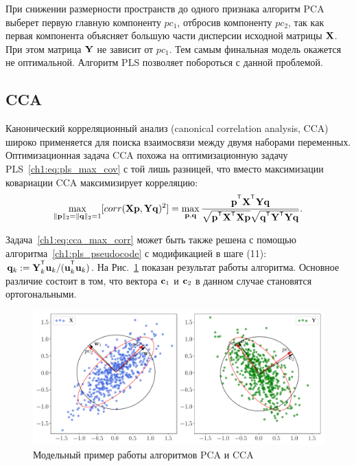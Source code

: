 При снижении размерности пространств до одного признака алгоритм PCA выберет первую главную компоненту $pc_1$, отбросив компоненту $pc_2$, так как первая компонента объясняет большую части дисперсии исходной матрицы $\mathbf{X}$. 
При этом матрица $\mathbf{Y}$ не зависит от $pc_1$. 
Тем самым финальная модель окажется не оптимальной.
Алгоритм PLS позволяет побороться с данной проблемой.

\subsection{CCA}

Канонический корреляционный анализ (canonical correlation analysis, CCA) широко применяется для поиска взаимосвязи между двумя наборами переменных. 
Оптимизационная задача CCA похожа на оптимизационную задачу PLS~\eqref{ch1:eq:pls_max_cov} с той лишь разницей, что вместо максимизации ковариации CCA максимизирует корреляцию:
\begin{equation}
	\max_{\|\bp\|_{2}=\|\bq\|_{2}=1}[ corr(\bX \bp, \bY \bq)^{2}] = \max_{\bp, \bq} \frac{\bp^{\T} \bX^{\T} \bY \bq}{\sqrt{\bp^{\T} \bX^{\T}  \bX \bp} \sqrt{\bq^{\T} \bY^{\T}  \bY\bq}}.
	\label{ch1:eq:cca_max_corr}
\end{equation}

Задача~\eqref{ch1:eq:cca_max_corr} может быть также решена с помощью алгоритма~\ref{ch1:pls_pseudocode} с модификацией в шаге (11): $\bq_k := \bY_k^{\T}\bu_k/(\bu_k^{\T}\bu_k)$.
На Рис.~\ref{ch1:fig:cca_toy_example} показан результат работы алгоритма. Основное различие состоит в том, что вектора $\mathbf{c}_1$ и $\mathbf{c}_2$ в данном случае становятся ортогональными.

\begin{figure}[h]
	\centering
	\includegraphics[width=\linewidth]{figs/ch1/cca_toy_example}
	\caption{Модельный пример работы алгоритмов PCA и CCA}
	\label{ch1:fig:cca_toy_example}
\end{figure}

